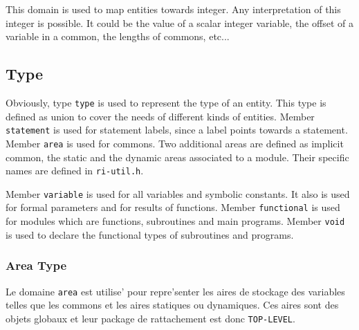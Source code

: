This domain is used to map entities towards integer. Any interpretation
of this integer is possible. It could be the value of a scalar integer
variable, the offset of a variable in a common, the lengths of commons,
etc...

\subsection{Type}
\label{subsection-type}


Obviously, type {\tt type} is used to represent the type of an
entity. This type is defined as union to cover the needs of different
kinds of entities. Member {\tt statement} is used for statement
labels, since a label points towards a statement. Member
{\tt area} is used for commons. Two additional areas are
defined as implicit common, the static and the dynamic areas associated
to a module. Their specific names are defined in {\tt ri-util.h}.

Member {\tt variable} is used for all variables and symbolic
constants. It also is used for formal parameters and for results of
functions. Member {\tt functional} is used for modules which are
functions, subroutines and main programs. Member {\tt void} is used to
declare the functional types of subroutines and programs.

\iffalse
Le domaine \verb/type/ repre'sente le type d'une entite'.  Le
sous-domaine \verb/statement/ est utilise' pour les labels
d'instruction.  Le sous-domaine \verb/area/ est utilise' pour les
commons et pour les deux zones statique et dynamique associe'e a` chaque
module.  Le sous-domaine \verb/variable/ est utilise' pour toutes les
variables, y compris les parame`tres formels et le re'sultat d'une
fonction.  Le sous-domaine \verb/functional/ est utilise' pour les
fonctions, pour les subroutines et pour le programme principal.  Le
sous-domaine \verb/void/ est utilise' pour le re'sultat d'une subroutine
ou d'un programme principal.
\fi

\subsubsection{Area Type}
\label{subsubsection-area}


Le domaine {\tt area} est utilise' pour repre'senter les aires de
stockage des variables telles que les commons et les aires statiques ou
dynamiques. Ces aires sont des objets globaux et leur package de
rattachement est donc \verb/TOP-LEVEL/.

